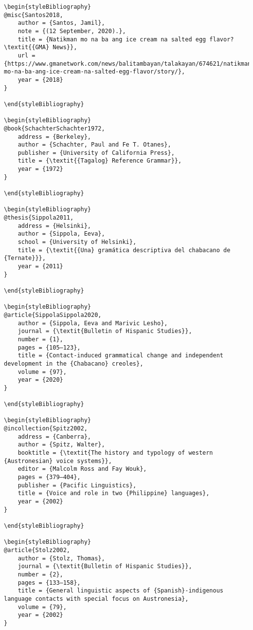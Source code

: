 \documentclass[output=paper]{langsci/langscibook}
\begin{document}
\begin{stylelsUnNumberedSection}
\begin{verbatim}
\begin{styleBibliography}
@misc{Santos2018,
	author = {Santos, Jamil},
	note = {(12 September, 2020).},
	title = {Natikman mo na ba ang ice cream na salted egg flavor? \textit{{GMA} News}},
	url = {https://www.gmanetwork.com/news/balitambayan/talakayan/674621/natikman-mo-na-ba-ang-ice-cream-na-salted-egg-flavor/story/},
	year = {2018}
}

\end{styleBibliography}

\begin{styleBibliography}
@book{SchachterSchachter1972,
	address = {Berkeley},
	author = {Schachter, Paul and Fe T. Otanes},
	publisher = {University of California Press},
	title = {\textit{{Tagalog} Reference Grammar}},
	year = {1972}
}

\end{styleBibliography}

\begin{styleBibliography}
@thesis{Sippola2011,
	address = {Helsinki},
	author = {Sippola, Eeva},
	school = {University of Helsinki},
	title = {\textit{{Una} gramática descriptiva del chabacano de {Ternate}}},
	year = {2011}
}

\end{styleBibliography}

\begin{styleBibliography}
@article{SippolaSippola2020,
	author = {Sippola, Eeva and Marivic Lesho},
	journal = {\textit{Bulletin of Hispanic Studies}},
	number = {1},
	pages = {105–123},
	title = {Contact-induced grammatical change and independent development in the {Chabacano} creoles},
	volume = {97},
	year = {2020}
}

\end{styleBibliography}

\begin{styleBibliography}
@incollection{Spitz2002,
	address = {Canberra},
	author = {Spitz, Walter},
	booktitle = {\textit{The history and typology of western {Austronesian} voice systems}},
	editor = {Malcolm Ross and Fay Wouk},
	pages = {379–404},
	publisher = {Pacific Linguistics},
	title = {Voice and role in two {Philippine} languages},
	year = {2002}
}

\end{styleBibliography}

\begin{styleBibliography}
@article{Stolz2002,
	author = {Stolz, Thomas},
	journal = {\textit{Bulletin of Hispanic Studies}},
	number = {2},
	pages = {133–158},
	title = {General linguistic aspects of {Spanish}-indigenous language contacts with special focus on Austronesia},
	volume = {79},
	year = {2002}
}


\end{verbatim}
\end{stylelsUnNumberedSection}
\end{document}
